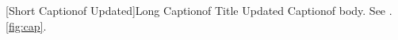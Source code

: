 [Short Captionof Updated]{Long Captionof Title Updated}\label{fig:cap}
Captionof body.
See . \autoref{fig:cap}.
